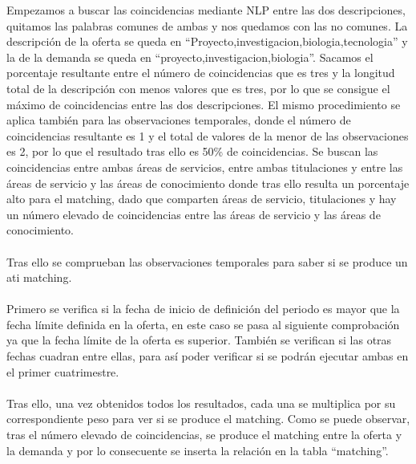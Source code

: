 \documentclass[11pt]{article}
\begin{document}
  Empezamos a buscar las coincidencias mediante NLP entre las dos descripciones, quitamos las palabras comunes de ambas y nos quedamos con las no comunes. La descripción de la oferta se queda en “Proyecto,investigacion,biologia,tecnologia” y la de la demanda se queda en “proyecto,investigacion,biologia”. Sacamos el porcentaje resultante entre el número de coincidencias que es tres y la longitud total de la descripción con menos valores que es tres, por lo que se consigue el máximo de coincidencias entre las dos descripciones. El mismo procedimiento se aplica también para las observaciones temporales, donde el número de coincidencias resultante es 1 y el total de valores de la menor de las observaciones es 2, por lo que el resultado tras ello es 50\% de coincidencias. Se buscan las coincidencias entre ambas áreas de servicios, entre ambas  titulaciones y entre las áreas de servicio y las áreas de conocimiento donde tras ello resulta un porcentaje alto para el matching, dado que comparten áreas de servicio, titulaciones y hay un número elevado de coincidencias entre las áreas de servicio y las áreas de conocimiento.\\\\
  Tras ello se comprueban las observaciones temporales para saber si se produce un ati matching.\\\\
  Primero se verifica si la fecha de inicio de definición del periodo es mayor que la fecha límite definida en la oferta, en este caso se pasa al siguiente comprobación ya que la fecha límite de la oferta es superior. También se verifican si las otras fechas cuadran entre ellas, para así poder verificar si se podrán ejecutar ambas en el primer cuatrimestre. \\\\
  Tras ello, una vez obtenidos todos los resultados, cada una se multiplica por su correspondiente peso para ver si se produce el matching. Como se puede observar, tras el número elevado de coincidencias, se produce el matching entre la oferta y la demanda y por lo consecuente se inserta la relación en la tabla “matching”.\\\\
  
\end{document}
